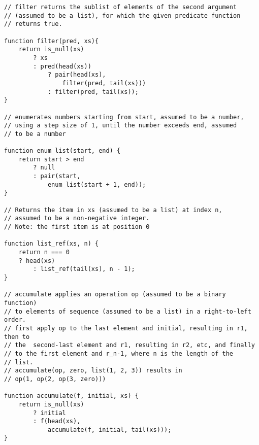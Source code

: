 \begin{lstlisting}
// filter returns the sublist of elements of the second argument
// (assumed to be a list), for which the given predicate function
// returns true.

function filter(pred, xs){
    return is_null(xs)
        ? xs
        : pred(head(xs))
            ? pair(head(xs),
                filter(pred, tail(xs)))
            : filter(pred, tail(xs));
}

// enumerates numbers starting from start, assumed to be a number,
// using a step size of 1, until the number exceeds end, assumed
// to be a number

function enum_list(start, end) {
    return start > end
        ? null
        : pair(start,
            enum_list(start + 1, end));
}

// Returns the item in xs (assumed to be a list) at index n,
// assumed to be a non-negative integer.
// Note: the first item is at position 0

function list_ref(xs, n) {
    return n === 0
	? head(xs)
        : list_ref(tail(xs), n - 1);
}

// accumulate applies an operation op (assumed to be a binary function)
// to elements of sequence (assumed to be a list) in a right-to-left order.
// first apply op to the last element and initial, resulting in r1, then to
// the  second-last element and r1, resulting in r2, etc, and finally
// to the first element and r_n-1, where n is the length of the
// list.
// accumulate(op, zero, list(1, 2, 3)) results in
// op(1, op(2, op(3, zero)))

function accumulate(f, initial, xs) {
    return is_null(xs)
        ? initial
        : f(head(xs),
            accumulate(f, initial, tail(xs)));
}
\end{lstlisting}


